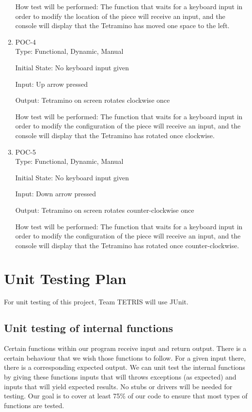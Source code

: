 \documentclass[12pt, titlepage]{article}
\begin{document}
\begin{enumerate}
How test will be performed: The function that waits for a keyboard input in order to modify the location of the piece will receive an input, and the console will display that the Tetramino has moved one space to the left.

\item{POC-4\\}
Type: Functional, Dynamic, Manual
					
Initial State: No keyboard input given
					
Input: Up arrow pressed
					
Output: Tetramino on screen rotates clockwise once
					
How test will be performed: The function that waits for a keyboard input in order to modify the configuration of the piece will receive an input, and the console will display that the Tetramino has rotated once clockwise.

\item{POC-5\\}
Type: Functional, Dynamic, Manual
					
Initial State: No keyboard input given
					
Input: Down arrow pressed
					
Output: Tetramino on screen rotates counter-clockwise once
					
How test will be performed: The function that waits for a keyboard input in order to modify the configuration of the piece will receive an input, and the console will display that the Tetramino has rotated once counter-clockwise.
					
\end{enumerate}

\section{Unit Testing Plan}
For unit testing of this project, Team TETRIS will use JUnit.

\subsection{Unit testing of internal functions}
Certain functions within our program receive input and return output. There is a certain behaviour that we wish those functions to follow. For a given input there, there is a corresponding expected output. We can unit test the internal functions by giving these functions inputs that will throws exceptions (as expected) and inputs that will yield expected results. No stubs or drivers will be needed for testing. Our goal is to cover at least 75\%  of our code to ensure that most types of functions are tested.        		
\end{document}
